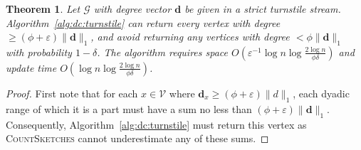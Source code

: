 \documentclass[10]{report}
\newtheorem{theorem}{Theorem}[section]
\newcommand{\algoname}[1]{\textnormal{\textsc{#1}}}
\begin{document}
\begin{theorem} \label{thm:dchh:turnstile}
Let $\mathcal{G}$ with degree vector $\mathbf{d}$ be given in a strict turnstile stream.
Algorithm~\ref{alg:dc:turnstile} can return every vertex with degree $\geq (\phi + \varepsilon)\|\mathbf{d}\|_1$, and avoid returning any vertices with degree $< \phi\|\mathbf{d}\|_1$ with probability $1-\delta$.
The algorithm requires space $O \left ( \varepsilon^{-1} \log n \log \frac{2 \log n}{\phi\delta} \right )$ and update time $O \left ( \log n \log \frac{2 \log n}{\phi \delta} \right )$.
\end{theorem}

\begin{proof}
First note that for each $x \in \mathcal{V}$ where $\mathbf{d}_x \geq (\phi + \varepsilon) \|d\|_1$, each dyadic range of which it is a part must have a sum no less than $(\phi + \varepsilon) \|\mathbf{d}\|_1$. 
Consequently, Algorithm~\ref{alg:dc:turnstile} must return this vertex as \algoname{CountSketches} cannot underestimate any of these sums.


\end{proof}
\end{document}
